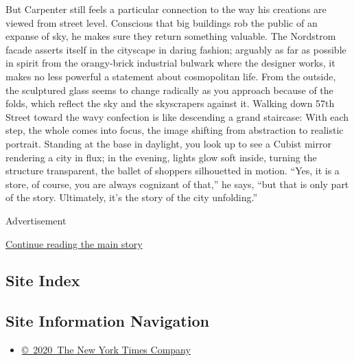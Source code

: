 But Carpenter still feels a particular connection to the way his
creations are viewed from street level. Conscious that big buildings rob
the public of an expanse of sky, he makes sure they return something
valuable. The Nordstrom facade asserts itself in the cityscape in daring
fashion; arguably as far as possible in spirit from the orangy-brick
industrial bulwark where the designer works, it makes no less powerful a
statement about cosmopolitan life. From the outside, the sculptured
glass seems to change radically as you approach because of the folds,
which reflect the sky and the skyscrapers against it. Walking down 57th
Street toward the wavy confection is like descending a grand staircase:
With each step, the whole comes into focus, the image shifting from
abstraction to realistic portrait. Standing at the base in daylight, you
look up to see a Cubist mirror rendering a city in flux; in the evening,
lights glow soft inside, turning the structure transparent, the ballet
of shoppers silhouetted in motion. ``Yes, it is a store, of course, you
are always cognizant of that,'' he says, ``but that is only part of the
story. Ultimately, it's the story of the city unfolding.''

Advertisement

\protect\hyperlink{after-bottom}{Continue reading the main story}

\hypertarget{site-index}{%
\subsection{Site Index}\label{site-index}}

\hypertarget{site-information-navigation}{%
\subsection{Site Information
Navigation}\label{site-information-navigation}}

\begin{itemize}
\tightlist
\item
  \href{https://help.nytimes3xbfgragh.onion/hc/en-us/articles/115014792127-Copyright-notice}{©~2020~The
  New York Times Company}
\end{itemize}

